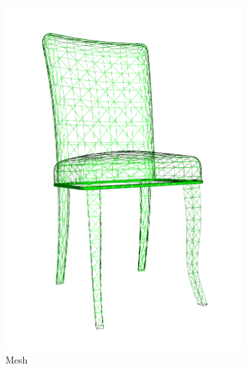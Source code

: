 \begin{figure}[!t]
	\centering
	\begin{subfigure}{0.2\linewidth}
		\includegraphics[width=\linewidth]{Figures/ObjRecog/chair_mesh}
		\caption{Mesh}
		\label{subfig:objrecog:3d_mesh_cloud_grid:mesh}
	\end{subfigure}
	\hfill
	\begin{subfigure}{0.2\linewidth}

\end{subfigure}
\end{figure}
